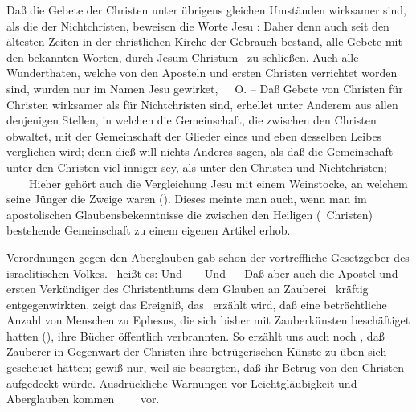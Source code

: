 \begin{aufza}
\item Daß die Gebete der Christen unter übrigens gleichen Umständen wirksamer sind, als die der Nichtchristen, beweisen die Worte Jesu :  Daher denn auch seit den ältesten Zeiten in der christlichen Kirche der Gebrauch bestand, alle Gebete mit den bekannten Worten, durch Jesum Christum \usw\ zu schließen. Auch alle Wunderthaten, welche von den Aposteln und ersten Christen verrichtet worden sind, wurden nur im Namen Jesu gewirket, \zB\ \ \uma\,O. -- Daß Gebete von Christen für Christen wirksamer als für Nichtchristen sind, erhellet unter Anderem aus allen denjenigen Stellen, in welchen die Gemeinschaft, die zwischen den Christen obwaltet, mit der Gemeinschaft der Glieder eines und eben desselben Leibes verglichen wird; denn dieß will nichts Anderes sagen, als daß die Gemeinschaft unter den Christen viel inniger sey, als unter den Christen und Nichtchristen; \zB\ \ \ \uma\  Hieher gehört auch die Vergleichung Jesu mit einem Weinstocke, an welchem seine Jünger die Zweige waren (). Dieses meinte man auch, wenn man im apostolischen Glaubensbekenntnisse die zwischen den Heiligen (\dh\ Christen) bestehende Gemeinschaft zu einem eigenen Artikel erhob.
\item Verordnungen gegen den Aberglauben gab schon der vortreffliche Gesetzgeber des israelitischen Volkes. \ heißt es:  Und \  -- Und \  \usw\ Daß aber auch die Apostel und ersten Verkündiger des Christenthums dem Glauben an Zauberei \udgl\  kräftig entgegenwirkten, zeigt das Ereigniß, das \ erzählt wird, daß eine beträchtliche Anzahl von Menschen zu Ephesus, die sich bisher mit Zauberkünsten beschäftiget hatten (), ihre Bücher öffentlich verbrannten. So erzählt uns auch noch , daß Zauberer in Gegenwart der Christen ihre betrügerischen Künste zu üben sich gescheuet hätten; gewiß nur, weil sie besorgten, daß ihr Betrug von den Christen aufgedeckt würde. Ausdrückliche Warnungen vor Leichtgläubigkeit und Aberglauben kommen \ \ \ \uamO\  vor.
\end{aufza}

